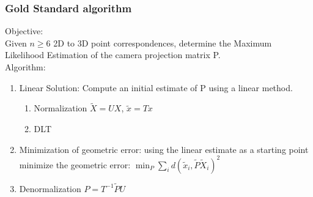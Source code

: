 \subsubsection{Gold Standard algorithm}
Objective:\\
Given $n \geq 6$ 2D to 3D point correspondences, determine the Maximum Likelihood Estimation of the camera projection matrix P.\\

Algorithm:
\begin{enumerate}
	\item Linear Solution: Compute an initial estimate of P using a linear method.
		\begin{enumerate}
			\item Normalization $\tilde{X} = UX$, $\tilde{x} = Tx$
			\item DLT
		\end{enumerate}
	\item Minimization of geometric error: using the linear estimate as a starting point minimize the geometric error: $\min_P \sum_{i}d(\tilde{x}_i,\tilde{P}\tilde{X}_i)^2$
	\item Denormalization $P = T^{-1}\tilde{P}U$
\end{enumerate}